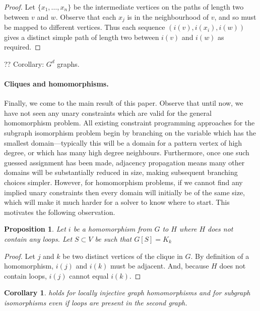 \documentclass{article}
\newtheorem{proposition}{Proposition}
\newtheorem{corollary}{Corollary}
\begin{document}
\begin{proof}Let $\{ x_1, \ldots, x_n \}$ be the intermediate vertices on the paths of length two
between $v$ and $w$. Observe that each $x_j$ is in the neighbourhood of $v$, and so must be mapped
    to different vertices. Thus each sequence $(i(v), i(x_i), i(w))$ gives a distinct simple path of
length two between $i(v)$ and $i(w)$ as required.\end{proof}

?? Corollary: $G^d$ graphs.

\paragraph{Cliques and homomorphisms.} Finally, we come to the main result of this paper. Observe
that until now, we have not seen any unary constraints which are valid for the general homomorphism
problem. All existing constraint programming approaches for the subgraph isomorphism problem begin
by branching on the variable which has the smallest domain---typically this will be a domain for a
pattern vertex of high degree, or which has many high degree neighbours. Furthermore, once one such
guessed assignment has been made, adjacency propagation means many other domains will be
substantially reduced in size, making subsequent branching choices simpler.  However, for
homomorphism problems, if we cannot find any implied unary constraints then every domain will
initially be of the same size, which will make it much harder for a solver to know where to start.
This motivates the following observation.

\begin{proposition}\label{proposition:clique}
    Let $i$ be a homomorphism from $G$ to $H$ where $H$ does
    not contain any loops. Let $S\subset V$ be such that $G[S]=K_k$
\end{proposition}

\begin{proof}
    Let $j$ and $k$ be two distinct vertices of the clique in $G$. By definition of a homomorphism,
    $i(j)$ and $i(k)$ must be adjacent. And, because $H$ does not contain loops, $i(j)$ cannot equal
    $i(k)$.
\end{proof}

\begin{corollary} holds for locally injective graph homomorphisms and for
    subgraph isomorphisms even if loops are present in the second graph.
\end{corollary}
\end{document}

